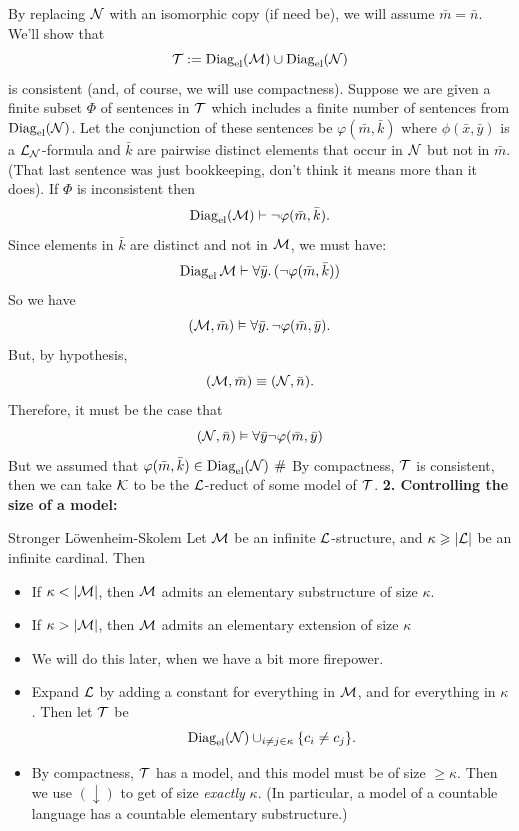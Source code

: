 \documentclass{article}
\numberwithin{thm}{subsection}
\begin{document}
\proof By replacing $\mathcal{N}$ with an isomorphic copy (if need be), we will assume $\bar m = \bar n$. \gap We'll show that \[ \mathcal{T} := \operatorname{Diag}_{\text{el}}(\mathcal{M}) \cup \operatorname{Diag}_{\text{el}}(\mathcal{N})\] is consistent (and, of course, we will use compactness). Suppose we are given a finite subset $\Phi$ of sentences in $\mathcal{T}$ which includes a finite number of sentences from $\operatorname{Diag}_{\text{el}}(\mathcal{N})$. Let the conjunction of these sentences be $\varphi (\bar m, \bar k)$ where $\phi(\bar x, \bar y)$ is a $\mathcal{L}_{\mathcal{N}}$-formula and $\bar k$ are pairwise distinct elements that occur in $\mathcal{N}$ but not in $\bar m$. (That last sentence was just bookkeeping, don't think it means more than it does). \gap 
If $\Phi$ is inconsistent then \[ \operatorname{Diag}_{\text{el}}(\mathcal{M}) \vdash \neg \varphi(\bar m, \bar k).\] Since elements in $\bar k$ are distinct and not in $\mathcal{M}$, we must have: \[ \operatorname{Diag}_{\text{el}}{\mathcal{M}} \vdash \forall \bar y. \, (\neg \varphi(\bar m, \bar k))\] So we have \[ (\mathcal{M},\bar m) \vDash \forall \bar y. \, \neg \varphi(\bar m, \bar y).\] But, by hypothesis,
\[ (\mathcal{M}, \bar m) \equiv (\mathcal{N}, \bar n).\] Therefore, it must be the case that \[ (\mathcal{N}, \bar n) \vDash \forall \bar y \neg \varphi(\bar m, \bar y)\] But we assumed that $\varphi(\bar m, \bar k) \in \operatorname{Diag}_{\text{el}}(\mathcal{N})$ $\#$ By compactness, $\mathcal{T}$ is consistent, then we can take $\mathcal{K}$ to be the $\mathcal{L}$-reduct of some model of $\mathcal{T}$.
\endproof
\textbf{2. Controlling the size of a model:} \gap 
\begin{fancythm}{Stronger L\"owenheim-Skolem}
    Let $\mathcal{M}$ be an infinite $\mathcal{L}$-structure, and $\kappa \geqslant |\mathcal{L}|$ be an infinite cardinal. Then \begin{itemize}
        \item[$(\downarrow)$] If $\kappa < |\mathcal{M}|$, then $\mathcal{M}$ admits an elementary substructure of size $\kappa$.
        \item[$(\uparrow)$] If $\kappa > |\mathcal{M}|$, then $\mathcal{M}$ admits an elementary extension of size $\kappa$
    \end{itemize}
\end{fancythm}
\proof \hspace{0.1cm}
 \begin{itemize}
    \item[$(\downarrow)$] We will do this later, when we have a bit more firepower.
    \item[$(\uparrow)$] Expand $\mathcal{L}$ by adding a constant for everything in $\mathcal{M}$, and for everything in $\kappa$. Then let $\mathcal{T}$ be \[\operatorname{Diag}_{\text{el}}(\mathcal{N}) \cup_{i\neq j \in \kappa} \{ c_{i} \neq c_{j} \}. \]
    \item[] By compactness, $\mathcal{T}$ has a model, and this model must be of size $\geq \kappa$. Then we use $(\downarrow)$ to get of size \textit{exactly} $\kappa$. (In particular, a model of a countable language has a countable elementary substructure.)  
\end{itemize}
\end{document}
